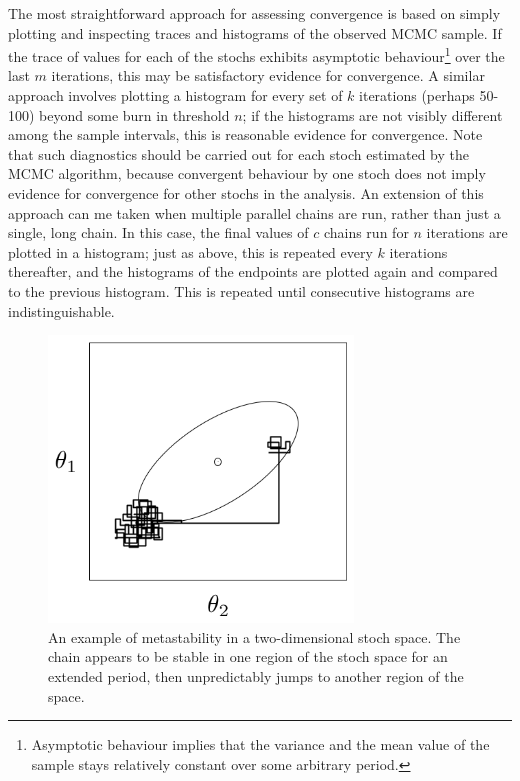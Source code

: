 \documentclass[]{book}
\begin{document}
The most straightforward approach for assessing convergence is based on simply plotting and inspecting traces and histograms of the observed MCMC sample. If the trace of values for each of the stochs exhibits asymptotic behaviour\footnote{Asymptotic behaviour implies that the variance and the mean value of the sample stays relatively constant over some arbitrary period.} over the last $m$ iterations, this may be satisfactory evidence for convergence. A similar approach involves plotting a histogram for every set of $k$ iterations (perhaps 50-100) beyond some burn in threshold $n$; if the histograms are not visibly different among the sample intervals, this is reasonable evidence for convergence. Note that such diagnostics should be carried out for each stoch estimated by the MCMC algorithm, because convergent behaviour by one stoch does not imply evidence for convergence for other stochs in the analysis. An extension of this approach can me taken when multiple parallel chains are run, rather than just a single, long chain. In this case, the final values of $c$ chains run for $n$ iterations are plotted in a histogram; just as above, this is repeated every $k$ iterations thereafter, and the histograms of the endpoints are plotted again and compared to the previous histogram. This is repeated until consecutive histograms are indistinguishable.

\begin{figure}[h]
\begin{center}
\includegraphics[height=3in]{metastable.png}
\caption{An example of metastability in a two-dimensional stoch space. The chain appears to be stable in one region of the stoch space for an extended period, then unpredictably jumps to another region of the space.}
\label{fig:metas}
\end{center}
\end{figure}
\end{document}
